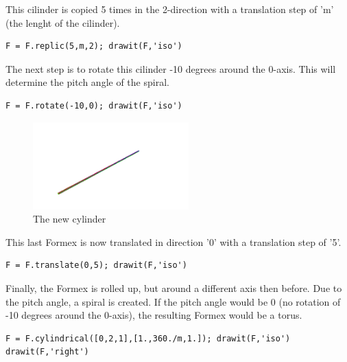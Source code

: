This cilinder is copied 5 times in the 2-direction with a translation step of 
'm' (the lenght of the cilinder). 
\begin{verbatim}
F = F.replic(5,m,2); drawit(F,'iso')
\end{verbatim}

The next step is to rotate this cilinder -10 degrees around the 0-axis. 
This will determine the pitch angle of the spiral.
\begin{verbatim}
F = F.rotate(-10,0); drawit(F,'iso')
\end{verbatim}
\begin{figure}[ht]
  \centering
  \begin{makeimage}
  \end{makeimage}
  \begin{latexonly}
    \includegraphics[width=6cm]{images/spiral-006}
  \end{latexonly}
  \begin{htmlonly}
  \end{htmlonly}  
  \caption{The new cylinder}
\end{figure}

This last Formex is now translated in direction '0' with a translation step of '5'. 
\begin{verbatim}
F = F.translate(0,5); drawit(F,'iso')
\end{verbatim}

Finally, the Formex is rolled up, but around a different axis then before. 
Due to the pitch angle, a spiral is created. If the pitch angle would be 0 
(no rotation of -10 degrees around the 0-axis), the resulting Formex 
would be a torus. 
\begin{verbatim}
F = F.cylindrical([0,2,1],[1.,360./m,1.]); drawit(F,'iso')
drawit(F,'right')
\end{verbatim}

